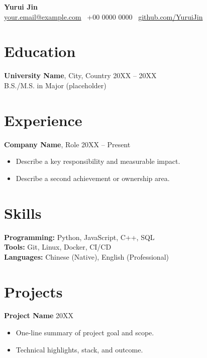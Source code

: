 \documentclass[11pt,a4paper]{article}
\begin{document}
{\LARGE \textbf{Yurui Jin}}\\
\href{mailto:your.email@example.com}{your.email@example.com} \textbar\
+00 0000 0000 \textbar\
\href{https://github.com/YuruiJin}{github.com/YuruiJin}

\section*{Education}
\textbf{University Name}, City, Country \hfill 20XX -- 20XX\\
B.S./M.S. in Major (placeholder)

\section*{Experience}
\textbf{Company Name}, Role \hfill 20XX -- Present
\begin{itemize}
  \item Describe a key responsibility and measurable impact.
  \item Describe a second achievement or ownership area.
\end{itemize}

\section*{Skills}
\textbf{Programming:} Python, JavaScript, C++, SQL\\
\textbf{Tools:} Git, Linux, Docker, CI/CD\\
\textbf{Languages:} Chinese (Native), English (Professional)

\section*{Projects}
\textbf{Project Name} \hfill 20XX
\begin{itemize}
  \item One-line summary of project goal and scope.
  \item Technical highlights, stack, and outcome.
\end{itemize}
\end{document}
